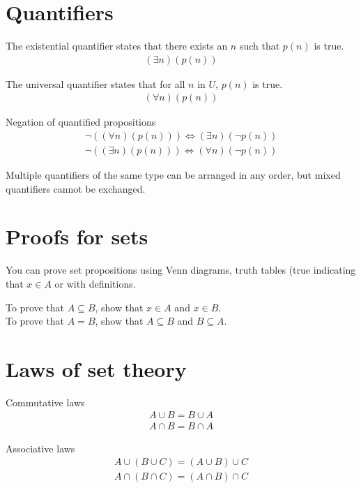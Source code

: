 \documentclass{article}
\begin{document}
\section{Quantifiers}

The existential quantifier states that there exists an $n$ such that $p(n)$ is true.
\begin{gather*}
    (\exists n)(p(n))
\end{gather*}

The universal quantifier states that for all $n$ in $U$, $p(n)$ is true.
\begin{gather*}
    (\forall n)(p(n))
\end{gather*}

Negation of quantified propositions
\begin{gather*}
    \neg ((\forall n)(p(n))) \Leftrightarrow (\exists n)(\neg p(n)) \\
    \neg ((\exists n)(p(n))) \Leftrightarrow (\forall n)(\neg p(n))
\end{gather*}

Multiple quantifiers of the same type can be arranged in any order, but mixed quantifiers cannot be exchanged.

\section{Proofs for sets}

You can prove set propositions using Venn diagrams, truth tables (true indicating that $x \in A$ or with definitions.

To prove that $A \subseteq B$, show that $x \in A$ and $x \in B$. \\
To prove that $A = B$, show that $A \subseteq B$ and $B \subseteq A$.

\section{Laws of set theory}

Commutative laws
\begin{gather*}
    A \cup B = B \cup A \\
    A \cap B = B \cap A
\end{gather*}

Associative laws
\begin{gather*}
    A \cup (B \cup C) = (A \cup B) \cup C \\
    A \cap (B \cap C) = (A \cap B) \cap C
\end{gather*}
\end{document}
